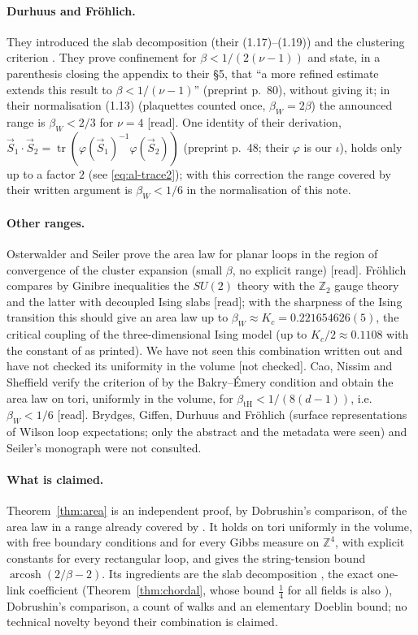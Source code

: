 \documentclass[11pt,a4paper]{article}
\theoremstyle{remark}
\theoremstyle{definition}
\theoremstyle{plain}
\theoremstyle{remark}
\DeclareMathOperator{\arcosh}{arcosh}
\newcommand{\Z}{\mathbb{Z}}
\newcommand{\st}[1]{\textsf{[#1]}}
\begin{document}
\paragraph{Durhuus and Fr\"ohlich.} They introduced the slab decomposition (their (1.17)--(1.19)) and the clustering criterion \cite{DF80}. They prove confinement for $\beta<1/(2(\nu-1))$ and state, in a parenthesis closing the appendix to their \S5, that ``a more refined estimate extends this result to $\beta<1/(\nu-1)$'' (preprint p.~80), without giving it; in their normalisation (1.13) (plaquettes counted once, $\beta_W=2\beta$) the announced range is $\beta_W<2/3$ for $\nu=4$ \st{read}. One identity of their derivation, $\vec S_1\cdot\vec S_2=\operatorname{tr}(\varphi(\vec S_1)^{-1}\varphi(\vec S_2))$ (preprint p.~48; their $\varphi$ is our $\iota$), holds only up to a factor $2$ (see \eqref{eq:al-trace2}); with this correction the range covered by their written argument is $\beta_W<1/6$ in the normalisation of this note.

\paragraph{Other ranges.} Osterwalder and Seiler \cite[Thm.~5.1]{OS78} prove the area law for planar loops in the region of convergence of the cluster expansion (small $\beta$, no explicit range) \st{read}. Fr\"ohlich \cite[(21)--(25)]{Fro79} compares by Ginibre inequalities the $SU(2)$ theory with the $\Z_2$ gauge theory and the latter with decoupled Ising slabs \st{read}; with the sharpness of the Ising transition \cite{ABF87} this should give an area law up to $\beta_W\approx K_c=0.221654626(5)$, the critical coupling of the three-dimensional Ising model \cite{FXL18} (up to $K_c/2\approx0.1108$ with the constant of \cite[(23)]{Fro79} as printed). We have not seen this combination written out and have not checked its uniformity in the volume \st{not checked}. Cao, Nissim and Sheffield \cite{CNS25} verify the criterion of \cite{DF80} by the Bakry--\'Emery condition and obtain the area law on tori, uniformly in the volume, for $\beta_{\mathrm{tH}}<1/(8(d-1))$, i.e.\ $\beta_W<1/6$ \st{read}. Brydges, Giffen, Durhuus and Fr\"ohlich \cite{BGDF86} (surface representations of Wilson loop expectations; only the abstract and the metadata were seen) and Seiler's monograph \cite{Sei82} were not consulted.

\paragraph{What is claimed.} Theorem~\ref{thm:area} is an independent proof, by Dobrushin's comparison, of the area law in a range already covered by \cite{BS83}. It holds on tori uniformly in the volume, with free boundary conditions and for every Gibbs measure on $\Z^4$, with explicit constants for every rectangular loop, and gives the string-tension bound $\arcosh(2/\beta-2)$. Its ingredients are the slab decomposition \cite{DF80,CNS25}, the exact one-link coefficient (Theorem~\ref{thm:chordal}, whose bound $\frac14$ for all fields is also \cite[Theorem~7]{BB26}), Dobrushin's comparison, a count of walks and an elementary Doeblin bound; no technical novelty beyond their combination is claimed.
\end{document}
